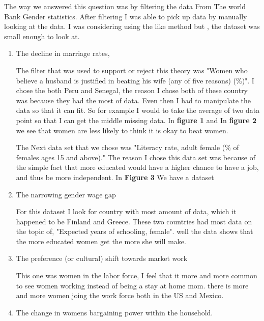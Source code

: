\documentclass[12pt]{article}
\begin{document}
The way we answered this question was by filtering the data 
From The world Bank Gender statistics. After filtering I was able to pick up data by manually looking at the data. I was considering using the like method but , the dataset was small enough to look at. 


\begin{enumerate}
\item The decline in marriage rates,

The filter that was used to support or reject this theory was "Women who believe a husband is justified in beating his wife (any of five reasons) (\%)". I chose the both Peru and Senegal, the reason I chose both of these country was because they had the most of data. Even then I had to manipulate the data so that it can fit. So for example I would to take the average of two data point so that I can get the middle missing data. In \textbf{figure 1} and In \textbf{figure 2} we see that women are less likely to think it is okay to beat women. 


The Next data set that we chose was "Literacy rate, adult female (\% of females ages 15 and above)." The reason I chose this data set was because of the simple fact that more educated would have a higher chance to have a job, and thus be more independent. In \textbf{Figure 3} We have a dataset  



\item The narrowing gender wage gap



For this dataset I look for country with most amount of data, which it happened to be Finland and Greece. These two countries had most data on the topic of, "Expected years of schooling, female". well the data shows that the more educated women get the more she will make.  











\item  The preference (or cultural) shift towards market work

This one was women in the labor force, I feel that it more and more common to see women working instead of being a stay at home mom. there is more and more women joing the work force both in the US and Mexico. 


\item  The change in womens bargaining power within the household.


\end{enumerate}
\end{document}
